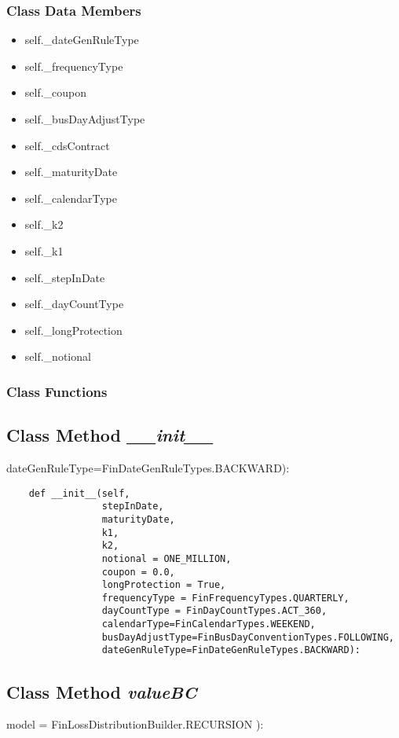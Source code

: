 \documentclass[twoside,11pt]{book}
\begin{document}
\subsubsection{Class Data Members}
\begin{itemize}
\item{self.\_dateGenRuleType}
\item{self.\_frequencyType}
\item{self.\_coupon}
\item{self.\_busDayAdjustType}
\item{self.\_cdsContract}
\item{self.\_maturityDate}
\item{self.\_calendarType}
\item{self.\_k2}
\item{self.\_k1}
\item{self.\_stepInDate}
\item{self.\_dayCountType}
\item{self.\_longProtection}
\item{self.\_notional}
\end{itemize}

\subsubsection{Class Functions}

\subsection{Class Method {\it \_\_init\_\_}}
dateGenRuleType=FinDateGenRuleTypes.BACKWARD):

\begin{lstlisting}
    def __init__(self, 
                 stepInDate,
                 maturityDate, 
                 k1, 
                 k2, 
                 notional = ONE_MILLION, 
                 coupon = 0.0, 
                 longProtection = True,
                 frequencyType = FinFrequencyTypes.QUARTERLY,
                 dayCountType = FinDayCountTypes.ACT_360,
                 calendarType=FinCalendarTypes.WEEKEND,
                 busDayAdjustType=FinBusDayConventionTypes.FOLLOWING,
                 dateGenRuleType=FinDateGenRuleTypes.BACKWARD):
\end{lstlisting}

\subsection{Class Method {\it valueBC}}
model = FinLossDistributionBuilder.RECURSION ):
\end{document}
